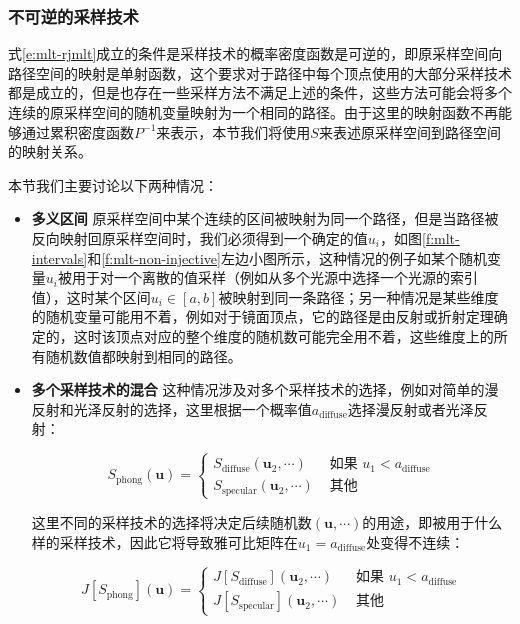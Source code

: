 \subsubsection{不可逆的采样技术}
式\ref{e:mlt-rjmlt}成立的条件是采样技术的概率密度函数是可逆的，即原采样空间向路径空间的映射是单射函数，这个要求对于路径中每个顶点使用的大部分采样技术都是成立的，但是也存在一些采样方法不满足上述的条件，这些方法可能会将多个连续的原采样空间的随机变量映射为一个相同的路径。由于这里的映射函数不再能够通过累积密度函数$P^{-1}$来表示，本节我们将使用$S$来表述原采样空间到路径空间的映射关系。

本节我们主要讨论以下两种情况：

\begin{itemize}
	\item \textbf{多义区间 }原采样空间中某个连续的区间被映射为同一个路径，但是当路径被反向映射回原采样空间时，我们必须得到一个确定的值$u_i$，如图\ref{f:mlt-intervals}和\ref{f:mlt-non-injective}左边小图所示，这种情况的例子如某个随机变量$u_i$被用于对一个离散的值采样（例如从多个光源中选择一个光源的索引值），这时某个区间$u_i\in[a,b]$被映射到同一条路径；另一种情况是某些维度的随机变量可能用不着，例如对于镜面顶点，它的路径是由反射或折射定理确定的，这时该顶点对应的整个维度的随机数可能完全用不着，这些维度上的所有随机数值都映射到相同的路径。
	\item \textbf{多个采样技术的混合 }这种情况涉及对多个采样技术的选择，例如对简单的漫反射和光泽反射的选择，这里根据一个概率值$a_{\text{diffuse}}$选择漫反射或者光泽反射：
	
	\begin{equation}
		S_{\text{phong}}(\mathbf{u})=\begin{cases}
			S_{\text{diffuse}}(\mathbf{u}_2,\cdots) & \text{ 如果 } u_1<a_{\text{diffuse}}\\
			S_{\text{specular}}(\mathbf{u}_2,\cdots) & \text{  其他 }
		\end{cases}
	\end{equation}
	
	\noindent 这里不同的采样技术的选择将决定后续随机数$(\mathbf{u},\cdots)$的用途，即被用于什么样的采样技术，因此它将导致雅可比矩阵在$u_1=a_{\text{diffuse}}$处变得不连续：
	
	\begin{equation}
		J[S_{\text{phong}}](\mathbf{u})=\begin{cases}
			J[S_{\text{diffuse}}](\mathbf{u}_2,\cdots) & \text{ 如果 } u_1<a_{\text{diffuse}}\\
			J[S_{\text{specular}}](\mathbf{u}_2,\cdots) & \text{  其他 }
		\end{cases}
	\end{equation}
\end{itemize}

